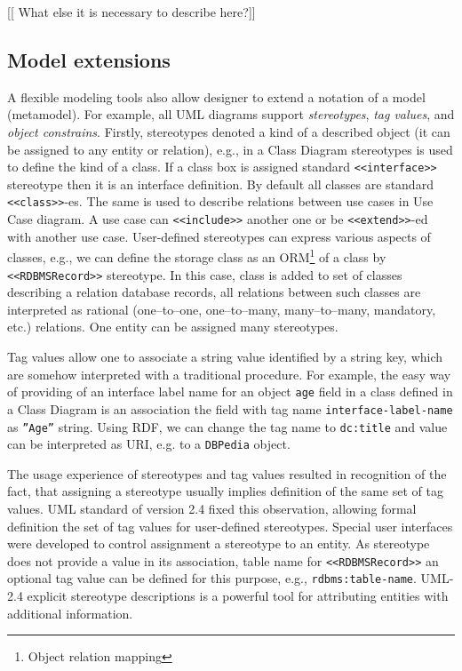\documentclass[conference]{IEEEtran}
\begin{document}
[[ What else it is necessary to describe here?]]

\subsection{Model extensions}
\label{sec:mod-ext}

A flexible modeling tools also allow designer to extend a notation of a model (metamodel).  For example, all UML diagrams support \emph{stereotypes}, \emph{tag values}, and \emph{object constrains}.  Firstly, stereotypes denoted a kind of a described object (it can be assigned to any entity or relation), e.g., in a Class Diagram stereotypes is used to define the kind of a class.  If a class box is assigned standard \texttt{<<interface>>} stereotype then it is an interface definition.  By default all classes are standard \texttt{<<class>>}-es.  The same is used to describe relations between use cases in Use Case diagram.  A use case can \texttt{<<include>>} another one or be \texttt{<<extend>>}-ed with another use case.  User-defined stereotypes can express various aspects of classes, e.g., we can define the storage class as an ORM\footnote{Object relation mapping} of a class by \texttt{<<RDBMSRecord>>} stereotype.  In this case, class is added to set of classes describing a relation database records, all relations between such classes are interpreted as rational (one--to--one, one--to--many, many--to--many, mandatory, etc.) relations.  One entity can be assigned many stereotypes.

Tag values allow one to associate a string value identified by a string key, which are somehow interpreted with a traditional procedure.  For example, the easy way of providing of an interface label name for an object \texttt{age} field in a class defined in a Class Diagram is an association the field with tag name \texttt{interface-label-name} as \texttt{''Age''} string.  Using RDF, we can change the tag name to \texttt{dc:title} and value can be interpreted as URI, e.g. to a \texttt{DBPedia} object.

The usage experience of stereotypes and tag values resulted in recognition of the fact, that assigning a stereotype usually implies definition of the same set of tag values.  UML standard of version 2.4 fixed this observation, allowing formal definition the set of tag values for user-defined stereotypes.  Special user interfaces were developed to control assignment a stereotype to an entity.  As stereotype does not provide a value in its association, table name for \texttt{<<RDBMSRecord>>} an optional tag value can be defined for this purpose, e.g., \texttt{rdbms:table-name}.  UML-2.4 explicit stereotype descriptions is a powerful tool for attributing entities with additional information.
\end{document}

